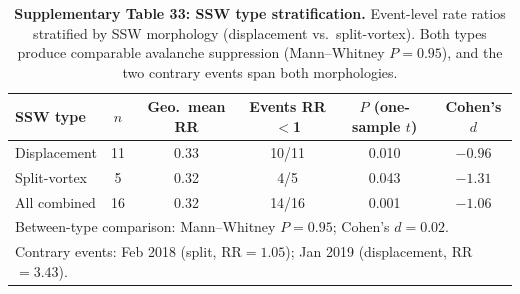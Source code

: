 \documentclass[11pt,letterpaper]{article}
\begin{document}
\begin{table}[htbp]
\centering
\caption{\textbf{Supplementary Table 33: SSW type stratification.} Event-level rate ratios stratified by SSW morphology (displacement vs.\ split-vortex). Both types produce comparable avalanche suppression (Mann--Whitney $P = 0.95$), and the two contrary events span both morphologies.}
\label{tab:ssw_type}
\small
\begin{tabular}{lccccc}
\toprule
\textbf{SSW type} & \textbf{$n$} & \textbf{Geo.\ mean RR} & \textbf{Events RR$<$1} & \textbf{$P$ (one-sample $t$)} & \textbf{Cohen's $d$} \\
\midrule
Displacement & 11 & 0.33 & 10/11 & 0.010 & $-0.96$ \\
Split-vortex & 5 & 0.32 & 4/5 & 0.043 & $-1.31$ \\
\midrule
All combined & 16 & 0.32 & 14/16 & 0.001 & $-1.06$ \\
\bottomrule
\multicolumn{6}{l}{\footnotesize Between-type comparison: Mann--Whitney $P = 0.95$; Cohen's $d = 0.02$.} \\
\multicolumn{6}{l}{\footnotesize Contrary events: Feb 2018 (split, RR$=1.05$); Jan 2019 (displacement, RR$=3.43$).} \\
\end{tabular}
\end{table}
\end{document}
